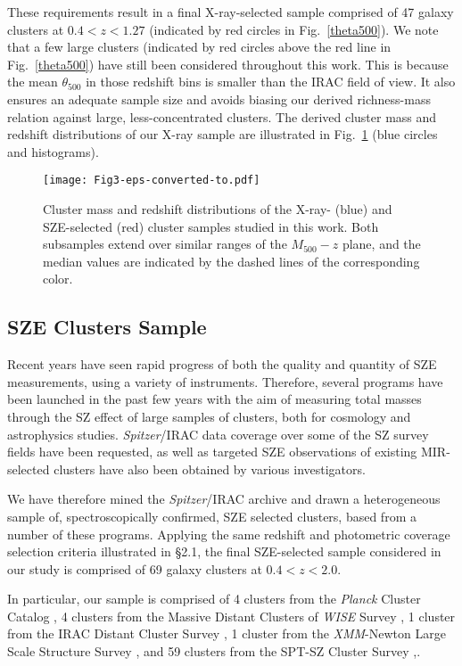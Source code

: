 \documentclass[apj,twocolumn]{emulateapj}
\begin{document}
{These requirements result in a final X-ray-selected sample comprised of 47 galaxy clusters at $0.4< z<1.27$ (indicated by red circles in Fig.~\ref{theta500}). We note that a few large clusters (indicated by red circles above the red line  in Fig.~\ref{theta500})  have still been considered throughout this work. This is because the mean $\theta_{500}$ in those redshift bins is smaller than the IRAC field
of view. It also ensures an adequate sample size and avoids biasing our derived richness-mass
relation against large, less-concentrated clusters. 
The derived cluster mass and redshift distributions of our X-ray sample are illustrated in Fig.~\ref{sample} (blue circles and histograms).

\begin{figure}
\texttt{[image: Fig3-eps-converted-to.pdf]}
\caption{Cluster mass and redshift distributions of the X-ray- (blue) and SZE-selected (red) cluster samples studied in this work. Both subsamples extend over similar ranges of the $M_{500} - z$ plane, and the median values are indicated by the dashed lines of the corresponding color.}
\label{sample}
\end{figure}

\subsection{SZE Clusters Sample}
Recent years have seen rapid progress of both the quality and quantity of SZE measurements, using a variety of instruments. Therefore, several programs have been launched in the past few years  with the aim of measuring total masses through the SZ effect of large samples of clusters, both for cosmology and astrophysics studies.
 {\it Spitzer}/IRAC data coverage over some of the SZ survey fields have been requested, as well as targeted SZE observations of existing MIR-selected clusters have also been obtained by various investigators.

We have therefore mined the  {\it Spitzer}/IRAC archive and drawn a heterogeneous sample of, spectroscopically confirmed, SZE selected clusters, based from a number of these programs.
Applying the same redshift and photometric coverage selection criteria illustrated in \S 2.1, the final SZE-selected sample considered in our study is comprised of 69 galaxy clusters at $0.4< z<2.0$. 

In particular, our sample is comprised of 4 clusters from the {\it Planck} Cluster Catalog \citep{Planck15},  4 clusters from the Massive Distant Clusters of {\it WISE} Survey \citep[MADCoWS,][]{Brodwin15}, 1 cluster from the IRAC Distant Cluster Survey \citep[IDCS,][]{Brodwin12},  1 cluster from the {\it XMM}-Newton Large Scale Structure Survey \citep[XLSSU,][]{Pierre11, Mantz14}, and 59 clusters from the SPT-SZ Cluster Survey \citep[SPT-SZ,][]{Bleem15},. 

}
\end{document}

